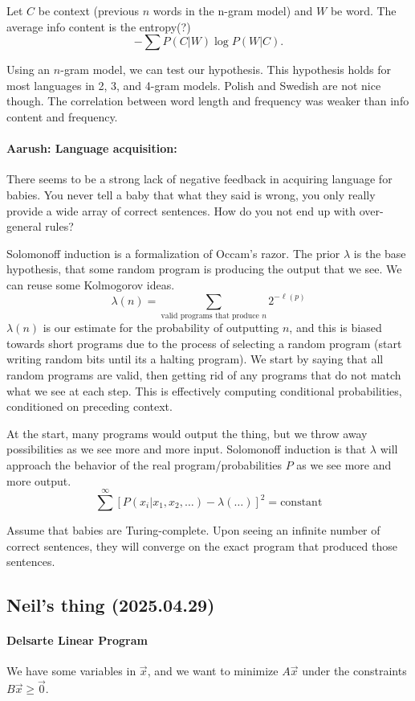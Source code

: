\documentclass[12pt]{article}
\theoremstyle{remark}
\begin{document}
Let $C$ be context (previous $n$ words in the n-gram model) and $W$ be word. The average info content is the entropy(?)
\[-\sum P(C|W) \log P(W|C).\]

Using an $n$-gram model, we can test our hypothesis. This hypothesis holds for most languages in 2, 3, and 4-gram models. Polish and Swedish are not nice though. The correlation between word length and frequency was weaker than info content and frequency.

\paragraph{Aarush: Language acquisition:} There seems to be a strong lack of negative feedback in acquiring language for babies. You never tell a baby that what they said is wrong, you only really provide a wide array of correct sentences. How do you not end up with over-general rules?

Solomonoff induction is a formalization of Occam's razor. The prior $\lambda$ is the base hypothesis, that some random program is producing the output that we see. We can reuse some Kolmogorov ideas.
\[\lambda(n) = \sum_\text{valid programs that produce $n$} 2^{-\ell(p)}\]
$\lambda(n)$ is our estimate for the probability of outputting $n$, and this is biased towards short programs due to the process of selecting a random program (start writing random bits until its a halting program). We start by saying that all random programs are valid, then getting rid of any programs that do not match what we see at each step. This is effectively computing conditional probabilities, conditioned on preceding context.

At the start, many programs would output the thing, but we throw away possibilities as we see more and more input. Solomonoff induction is that $\lambda$ will approach the behavior of the real program/probabilities $P$ as we see more and more output.
\[\sum^\infty [P(x_i|x_1,x_2,\dots)-\lambda(\dots)]^2=\text{constant}\]

Assume that babies are Turing-complete. Upon seeing an infinite number of correct sentences, they will converge on the exact program that produced those sentences.

\subsection{Neil's thing (2025.04.29)}
\paragraph{Delsarte Linear Program} We have some variables in $\vec x$, and we want to minimize $A\vec x$ under the constraints $B\vec x \ge \vec 0$.
\end{document}
